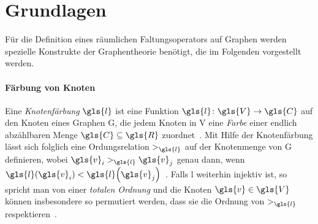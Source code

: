 \section{Grundlagen}
\label{raeumliche_grundlagen}

Für die Definition eines räumlichen Faltungsoperators auf Graphen werden spezielle Konstrukte der Graphentheorie benötigt, die im Folgenden vorgestellt werden.

\paragraph{Färbung von Knoten}
\label{faerbung_von_knoten}

Eine \emph{Knotenfärbung} $\gls{l}$ ist eine Funktion $\gls{l} \colon \gls{V} \to \gls{C}$ auf den Knoten eines Graphen \gls{G}, die jedem Knoten in \gls{V} eine \emph{Farbe} einer endlich abzählbaren Menge $\gls{C} \subseteq \gls{R}$ zuordnet~\cite{patchy}.
Mit Hilfe der Knotenfärbung lässt sich folglich eine Ordungsrelation $>_{\gls{l}}$ auf der Knotenmenge von \gls{G} definieren, wobei $\gls{v}_i >_{\gls{l}} \gls{v}_j$ genau dann, wenn $\gls{l}\left(\gls{v}_i\right) < \gls{l}\left(\gls{v}_j\right)$~\cite{patchy}.
Falls \gls{l} weiterhin injektiv ist, so spricht man von einer \emph{totalen Ordnung} und die Knoten $\gls{v} \in \gls{V}$ können insbesondere so permutiert werden, dass sie die Ordnung von $>_{\gls{l}}$ respektieren~\cite{patchy}.

